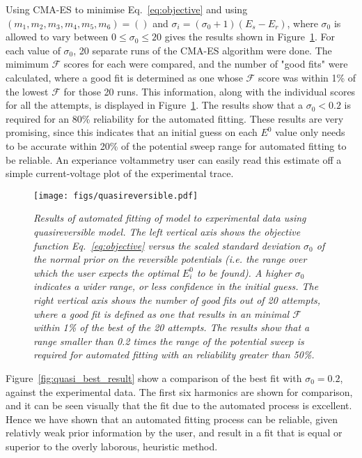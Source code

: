 \documentclass[a4paper, 12pt]{article}
\begin{document}
Using CMA-ES to minimise Eq.~\ref{eq:objective} and using
$(m_1,m_2,m_3,m_4,m_5,m_6) = ()$ and $\sigma_i = (\sigma_0+1)(E_s-E_r)$, where
$\sigma_0$ is allowed to vary between $0 \le \sigma_0 \le 20$ gives the results
shown in Figure~\ref{fig:quasi_results}. For each value of $\sigma_0$, 20 separate
runs of the CMA-ES algorithm were done. The mimimum $\mathcal{F}$ scores for
each were compared, and the number of "good fits" were calculated, where a good
fit is determined as one whose $\mathcal{F}$ score was within 1\% of the lowest
$\mathcal{F}$ for those 20 runs. This information, along with the individual
scores for all the attempts, is displayed in Figure~\ref{fig:quasi_results}. The
results show that a $\sigma_0 < 0.2$ is required for an 80\% reliability for the
automated fitting. These results are very promising, since this indicates that
an initial guess on each $E^0$ value only needs to be accurate within 20\% of
the potential sweep range for automated fitting to be reliable. An experiance
voltammetry user can easily read this estimate off a simple current-voltage plot
of the experimental trace.

\begin{figure}[htbp]
\texttt{[image: figs/quasireversible.pdf]}
    \caption{\it{Results of automated fitting of model to experimental data
    using quasireversible model. The left vertical axis shows the objective
    function Eq.~\ref{eq:objective} versus the scaled standard deviation
    $\sigma_0$ of the normal prior on the reversible potentials (i.e. the range
    over which the user expects the optimal $E^0_i$ to be found). A higher
    $\sigma_0$ indicates a wider range, or less confidence in the initial guess.
    The right vertical axis shows the number of good fits out of 20 attempts,
    where a good fit is defined as one that results in an minimal $\mathcal{F}$
    within 1\% of the best of the 20 attempts. The results show that a range
    smaller than 0.2 times the range of the potential sweep is required for
    automated fitting with an reliability greater than 50\%.}}
    \label{fig:quasi_results}
\end{figure}

Figure~\ref{fig:quasi_best_result} show a comparison of the best fit with
$\sigma_0=0.2$, against the experimental data. The first six harmonics are shown
for comparison, and it can be seen visually that the fit due to the automated
process is excellent. Hence we have shown that an automated fitting process can
be reliable, given relativly weak prior information by the user, and result in a
fit that is equal or superior to the overly laborous, heuristic method.
\end{document}
